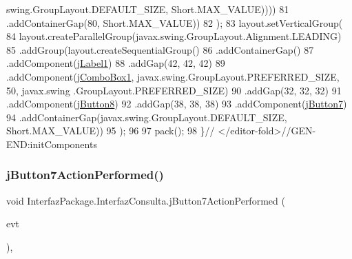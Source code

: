\begin{DoxyCode}
      swing.GroupLayout.DEFAULT\_SIZE, Short.MAX\_VALUE))))
81                 .addContainerGap(80, Short.MAX\_VALUE))
82         );
83         layout.setVerticalGroup(
84             layout.createParallelGroup(javax.swing.GroupLayout.Alignment.LEADING)
85             .addGroup(layout.createSequentialGroup()
86                 .addContainerGap()
87                 .addComponent(\mbox{\hyperlink{class_interfaz_package_1_1_interfaz_consulta_aeeb159dc49a945f8285bc200316b7b38}{jLabel1}})
88                 .addGap(42, 42, 42)
89                 .addComponent(\mbox{\hyperlink{class_interfaz_package_1_1_interfaz_consulta_adc5bff154b6dcb8682ea4727b7783ee5}{jComboBox1}}, javax.swing.GroupLayout.PREFERRED\_SIZE, 50, javax.swing
      .GroupLayout.PREFERRED\_SIZE)
90                 .addGap(32, 32, 32)
91                 .addComponent(\mbox{\hyperlink{class_interfaz_package_1_1_interfaz_consulta_a82083645edf763690351c2f33263a8a1}{jButton8}})
92                 .addGap(38, 38, 38)
93                 .addComponent(\mbox{\hyperlink{class_interfaz_package_1_1_interfaz_consulta_afd5c627098a6c6bb116f8120486ba5bd}{jButton7}})
94                 .addContainerGap(javax.swing.GroupLayout.DEFAULT\_SIZE, Short.MAX\_VALUE))
95         );
96 
97         pack();
98     \}\textcolor{comment}{// </editor-fold>//GEN-END:initComponents}
\end{DoxyCode}
\mbox{\label{class_interfaz_package_1_1_interfaz_consulta_abd82ed50489881b74e9832dfdd4e82a1}} 
\subsubsection{\texorpdfstring{j\+Button7\+Action\+Performed()}{jButton7ActionPerformed()}}
{\footnotesize\ttfamily void Interfaz\+Package.\+Interfaz\+Consulta.\+j\+Button7\+Action\+Performed (\begin{DoxyParamCaption}\item[{java.\+awt.\+event.\+Action\+Event}]{evt }\end{DoxyParamCaption})\hspace{0.3cm}{\ttfamily [inline]}, {\ttfamily [private]}}



